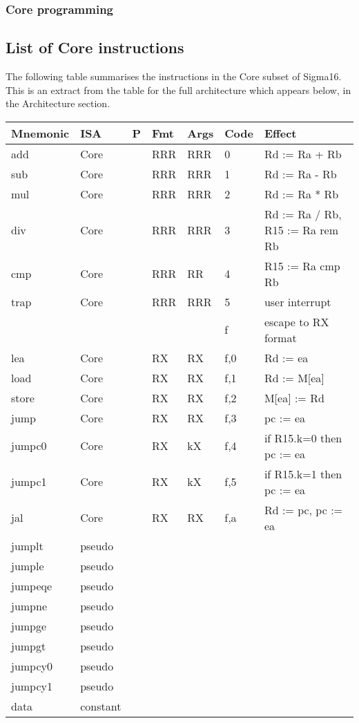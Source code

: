 \documentclass[11pt]{article}
\begin{document}
\subsubsection*{Core programming}
\label{sec:org6ecd880}
\subsection*{List of Core instructions}
\label{sec:org9842051}

The following table summarises the instructions in the Core subset of
Sigma16.  This is an extract from the table for the full architecture
which appears below, in the Architecture section.

\begin{center}
\begin{tabular}{lllllll}
\hline
Mnemonic & ISA & P & Fmt & Args & Code & Effect\\
\hline
add & Core &  & RRR & RRR & 0 & Rd := Ra + Rb\\
sub & Core &  & RRR & RRR & 1 & Rd := Ra - Rb\\
mul & Core &  & RRR & RRR & 2 & Rd := Ra * Rb\\
div & Core &  & RRR & RRR & 3 & Rd := Ra / Rb, R15 := Ra rem Rb\\
cmp & Core &  & RRR & RR & 4 & R15 := Ra cmp Rb\\
trap & Core &  & RRR & RRR & 5 & user interrupt\\
 &  &  &  &  & f & escape to RX format\\
\hline
lea & Core &  & RX & RX & f,0 & Rd := ea\\
load & Core &  & RX & RX & f,1 & Rd := M[ea]\\
store & Core &  & RX & RX & f,2 & M[ea] := Rd\\
jump & Core &  & RX & RX & f,3 & pc := ea\\
jumpc0 & Core &  & RX & kX & f,4 & if R15.k=0 then pc := ea\\
jumpc1 & Core &  & RX & kX & f,5 & if R15.k=1 then pc := ea\\
jal & Core &  & RX & RX & f,a & Rd := pc, pc := ea\\
\hline
jumplt & pseudo &  &  &  &  & \\
jumple & pseudo &  &  &  &  & \\
jumpeqe & pseudo &  &  &  &  & \\
jumpne & pseudo &  &  &  &  & \\
jumpge & pseudo &  &  &  &  & \\
jumpgt & pseudo &  &  &  &  & \\
jumpcy0 & pseudo &  &  &  &  & \\
jumpcy1 & pseudo &  &  &  &  & \\
\hline
data & constant &  &  &  &  & \\
\hline
\hline
\end{tabular}
\end{center}
\end{document}
